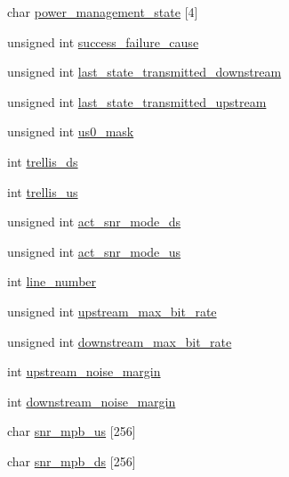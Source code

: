 \begin{DoxyCompactItemize}
\item 
char \hyperlink{structdsl__fapi__line__obj_a68ff1d736ad8367e195bd2d616a5db96}{power\-\_\-management\-\_\-state} \mbox{[}4\mbox{]}
\item 
unsigned int \hyperlink{structdsl__fapi__line__obj_a5c1ff715c2f106c556ce842423b9e4d5}{success\-\_\-failure\-\_\-cause}
\item 
unsigned int \hyperlink{structdsl__fapi__line__obj_a1b028b5780559bbff623c43f64c9221d}{last\-\_\-state\-\_\-transmitted\-\_\-downstream}
\item 
unsigned int \hyperlink{structdsl__fapi__line__obj_abb97dc2b4546129f3f3843fb29134e41}{last\-\_\-state\-\_\-transmitted\-\_\-upstream}
\item 
unsigned int \hyperlink{structdsl__fapi__line__obj_a7dc65fd86cd6cf3f31266f8ef3000e72}{us0\-\_\-mask}
\item 
int \hyperlink{structdsl__fapi__line__obj_a57a4eae0070c86f939ecdd97d5e79120}{trellis\-\_\-ds}
\item 
int \hyperlink{structdsl__fapi__line__obj_abb8859a3b3856147be87ac8e0ae7e49a}{trellis\-\_\-us}
\item 
unsigned int \hyperlink{structdsl__fapi__line__obj_a847673509738e19ead5a23922316be96}{act\-\_\-snr\-\_\-mode\-\_\-ds}
\item 
unsigned int \hyperlink{structdsl__fapi__line__obj_a52ceef229b988f92bff6977fd32fc143}{act\-\_\-snr\-\_\-mode\-\_\-us}
\item 
int \hyperlink{structdsl__fapi__line__obj_adc1ce69a9211c94934ec7762608d8db7}{line\-\_\-number}
\item 
unsigned int \hyperlink{structdsl__fapi__line__obj_a77393004674703f57ced05902108019d}{upstream\-\_\-max\-\_\-bit\-\_\-rate}
\item 
unsigned int \hyperlink{structdsl__fapi__line__obj_a4e2dded4c31f6f40d1fa1a978e6ed1ec}{downstream\-\_\-max\-\_\-bit\-\_\-rate}
\item 
int \hyperlink{structdsl__fapi__line__obj_aa16c906c255a409649f2b710d359d6b6}{upstream\-\_\-noise\-\_\-margin}
\item 
int \hyperlink{structdsl__fapi__line__obj_ac5cafce7d8f514b83612e26792e71ebb}{downstream\-\_\-noise\-\_\-margin}
\item 
char \hyperlink{structdsl__fapi__line__obj_a8298962b9eab965d69375c8dc8689c38}{snr\-\_\-mpb\-\_\-us} \mbox{[}256\mbox{]}
\item 
char \hyperlink{structdsl__fapi__line__obj_a7e443ec40d324e5b435873f8e8823d69}{snr\-\_\-mpb\-\_\-ds} \mbox{[}256\mbox{]}

\end{DoxyCompactItemize}
